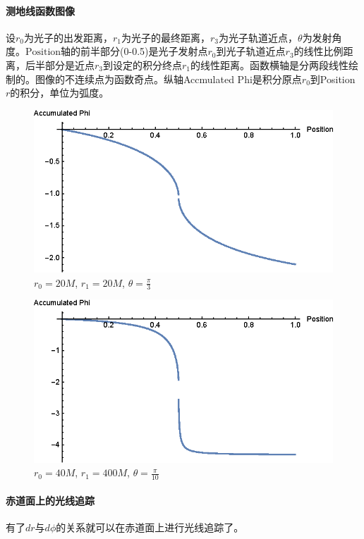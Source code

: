 \paragraph{测地线函数图像}
设$r_0$为光子的出发距离，$r_1$为光子的最终距离，$r_3$为光子轨道近点，$\theta$为发射角度。$\text{Position}$轴的前半部分(0-0.5)是光子发射点$r_0$到光子轨道近点$r_3$的线性比例距离，后半部分是近点$r_3$到设定的积分终点$r_1$的线性距离。函数横轴是分两段线性绘制的。图像的不连续点为函数奇点。纵轴Accmulated Phi是积分原点$r_0$到Position $r$的积分，单位为弧度。
\begin{figure}[htbp]
    \centering
    \includegraphics[]{images/dphi_1.eps}
    \caption{$r_0=20M$, $r_1=20M$, $\theta=\frac{\pi}{3}$}\label{dphi_1} %
\end{figure}

\begin{figure}[htbp]
    \centering
    \includegraphics[]{images/dphi_2.eps}
    \caption{$r_0=40M$, $r_1=400M$, $\theta=\frac{\pi}{10}$}\label{dphi_2} %
\end{figure}

\paragraph{赤道面上的光线追踪}
有了$dr$与$d\phi$的关系就可以在赤道面上进行光线追踪了。
